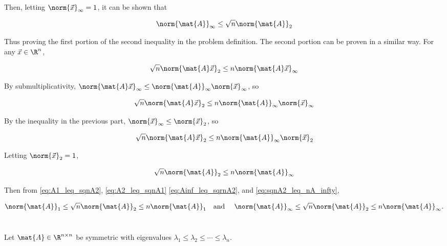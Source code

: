 \documentclass{template}
\begin{document}
Then, letting $\norm{\vec{x}}_\infty = 1$, it can be shown that

\begin{equation}\label{eq:Ainf_leq_sqrnA2}
    \norm{\mat{A}}_\infty \leq \sqrt{n}\norm{\mat{A}}_2
\end{equation}

Thus proving the first portion of the second inequality in the problem definition. The second portion can be proven in a similar way. For any $\vec{x} \in \R^n$,

\begin{equation}
    \sqrt{n}\norm{\mat{A}\vec{x}}_2 \leq n\norm{\mat{A}\vec{x}}_\infty
\end{equation}

By submultiplicativity, $\norm{\mat{A}\vec{x}}_\infty \leq \norm{\mat{A}}_\infty\norm{\vec{x}}_\infty$, so

\begin{equation}
    \sqrt{n}\norm{\mat{A}\vec{x}}_2 \leq n\norm{\mat{A}}_\infty\norm{\vec{x}}_\infty
\end{equation}

By the inequality in the previous part, $\norm{\vec{x}}_\infty \leq \norm{\vec{x}}_2$, so

\begin{equation}
    \sqrt{n}\norm{\mat{A}\vec{x}}_2 \leq n\norm{\mat{A}}_\infty\norm{\vec{x}}_2
\end{equation}

Letting $\norm{\vec{x}}_2 = 1$, 

\begin{equation}\label{eq:sqnA2_leq_nA_infty}
    \sqrt{n}\norm{\mat{A}}_2 \leq n\norm{\mat{A}}_\infty
\end{equation}

Then from \autoref{eq:A1_leq_sqnA2}, \ref{eq:A2_leq_sqnA1} \ref{eq:Ainf_leq_sqrnA2}, and \ref{eq:sqnA2_leq_nA_infty}, 

\begin{equation}
    \norm{\mat{A}}_1 \leq \sqrt{n} \norm{\mat{A}}_2 \leq n \norm{\mat{A}}_1 \quad \text{and } \quad 
    \norm{\mat{A}}_\infty \leq \sqrt{n} \norm{\mat{A}}_2 \leq n \norm{\mat{A}}_\infty.
\end{equation}


\newpage
\section{}

Let $\mat{A} \in \R^{n \times n}$ be symmetric with eigenvalues
$\lambda_1 \leq \lambda_2 \leq \cdots \leq \lambda_n$.
\end{document}
